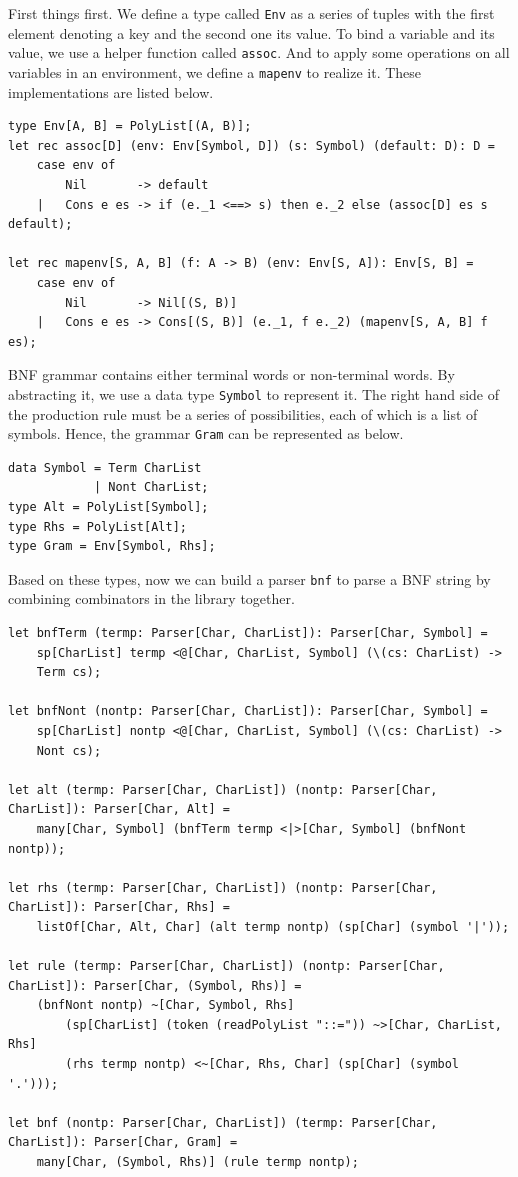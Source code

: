First things first. We define a type called \texttt{Env} as a series of tuples with the first element denoting a key and the second one its value. To bind a variable and its value, we use a helper function called \texttt{assoc}. And to apply some operations on all variables in an environment, we define a \texttt{mapenv} to realize it. These implementations are listed below.

\begin{lstlisting}
type Env[A, B] = PolyList[(A, B)];
let rec assoc[D] (env: Env[Symbol, D]) (s: Symbol) (default: D): D =
    case env of
        Nil       -> default
    |   Cons e es -> if (e._1 <==> s) then e._2 else (assoc[D] es s default);

let rec mapenv[S, A, B] (f: A -> B) (env: Env[S, A]): Env[S, B] =
    case env of
        Nil       -> Nil[(S, B)]
    |   Cons e es -> Cons[(S, B)] (e._1, f e._2) (mapenv[S, A, B] f es);
\end{lstlisting}

BNF grammar contains either terminal words or non-terminal words. By abstracting it, we use a data type \texttt{Symbol} to represent it. The right hand side of the production rule must be a series of possibilities, each of which is a list of symbols. Hence, the grammar \texttt{Gram} can be represented as below.

\begin{lstlisting}
data Symbol = Term CharList
            | Nont CharList;
type Alt = PolyList[Symbol];
type Rhs = PolyList[Alt];
type Gram = Env[Symbol, Rhs];
\end{lstlisting}

Based on these types, now we can build a parser \texttt{bnf} to parse a BNF string by combining combinators in the library together.

\begin{lstlisting}
let bnfTerm (termp: Parser[Char, CharList]): Parser[Char, Symbol] =
    sp[CharList] termp <@[Char, CharList, Symbol] (\(cs: CharList) ->
    Term cs);

let bnfNont (nontp: Parser[Char, CharList]): Parser[Char, Symbol] =
    sp[CharList] nontp <@[Char, CharList, Symbol] (\(cs: CharList) ->
    Nont cs);

let alt (termp: Parser[Char, CharList]) (nontp: Parser[Char, CharList]): Parser[Char, Alt] =
    many[Char, Symbol] (bnfTerm termp <|>[Char, Symbol] (bnfNont nontp));

let rhs (termp: Parser[Char, CharList]) (nontp: Parser[Char, CharList]): Parser[Char, Rhs] =
    listOf[Char, Alt, Char] (alt termp nontp) (sp[Char] (symbol '|'));

let rule (termp: Parser[Char, CharList]) (nontp: Parser[Char, CharList]): Parser[Char, (Symbol, Rhs)] =
    (bnfNont nontp) ~[Char, Symbol, Rhs]
        (sp[CharList] (token (readPolyList "::=")) ~>[Char, CharList, Rhs]
        (rhs termp nontp) <~[Char, Rhs, Char] (sp[Char] (symbol '.')));

let bnf (nontp: Parser[Char, CharList]) (termp: Parser[Char, CharList]): Parser[Char, Gram] =
    many[Char, (Symbol, Rhs)] (rule termp nontp);
\end{lstlisting}

